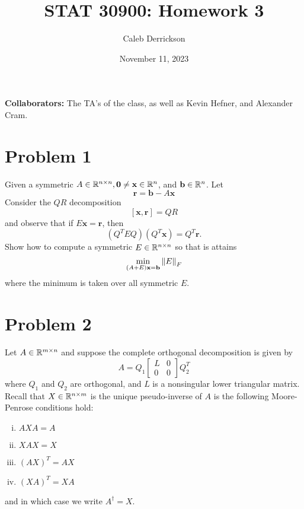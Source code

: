 

\title{STAT 30900: Homework 3}
\author{Caleb Derrickson}
\date{November 11, 2023}


\onehalfspacing
\maketitle
\allowdisplaybreaks
{\color{cit}\vspace{2mm}\noindent\textbf{Collaborators:}} The TA's of the class, as well as Kevin Hefner, and Alexander Cram.

\tableofcontents

\newpage
\section{Problem 1}
Given a symmetric $A \in \mathbb{R}^{n\times n}, \textbf{0} \neq \textbf{x} \in \mathbb{R}^n$, and $\textbf{b} \in \mathbb{R}^n$. Let 
\[
\textbf{r} = \textbf{b} - A\textbf{x}
\]
Consider the $QR$ decomposition
\[
[\textbf{x}, \textbf{r}] = QR
\]
and observe that if $E\textbf{x} = \textbf{r}$, then
\[
(Q^TEQ)(Q^T\textbf{x}) = Q^T\textbf{r}.
\]
Show how to compute a symmetric $E \in \mathbb{R}^{n\times n}$ so that is attains 
\[
\min_{(A+E)\textbf{x} = \textbf{b}}\norm{E}_F
\]
where the minimum is taken over all symmetric $E$.

\newpage
\section{Problem 2}
Let $A \in \mathbb{R}^{m \times n}$ and suppose the complete orthogonal decomposition is given by
\[
A = Q_1 \begin{bmatrix}L &0\\0&0\end{bmatrix}Q_2^T
\]
where $Q_1$ and $Q_2$ are orthogonal, and $L$ is a nonsingular lower triangular matrix. Recall that $X \in \mathbb{R}^{n \times m}$ is the unique pseudo-inverse of $A$ is the following Moore-Penrose conditions hold:
\begin{enumerate}[(i)]
    \item $AXA = A$ 
    \item $XAX = X$ 
    \item $(AX)^T = AX$ 
    \item $(XA)^T = XA$
\end{enumerate}
and in which case we write $A^\dag = X$.

